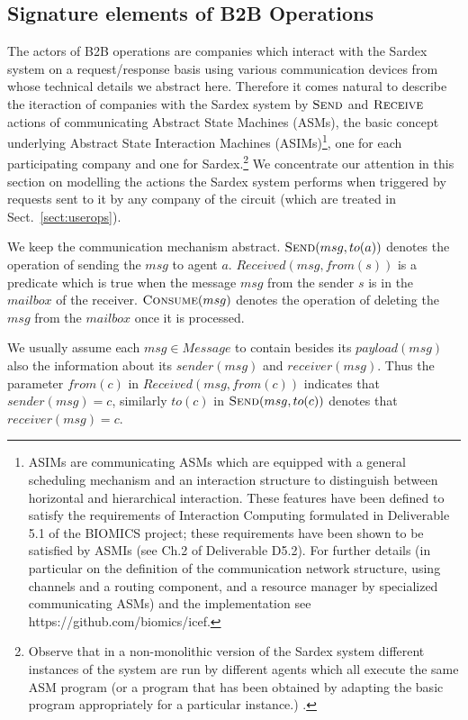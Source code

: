 \subsection{Signature elements of B2B Operations}
\label{signaturepaymtop}
The actors of B2B operations are companies which interact with the Sardex system on a request/response basis using various 
communication devices from whose technical details we abstract here. Therefore it comes natural to describe the iteraction of companies with the Sardex system by 
$\hbox{\sc Send}$ and $\hbox{\sc Receive}$ actions of communicating Abstract State Machines
(ASMs), the basic concept underlying Abstract State Interaction Machines (ASIMs)\footnote{ASIMs are communicating ASMs which are equipped with a general
scheduling mechanism and an interaction structure to distinguish
between horizontal and hierarchical interaction. These features have
been defined to satisfy the requirements of Interaction Computing
formulated in Deliverable 5.1 of the BIOMICS project; these
requirements have been shown to be satisfied by ASMIs (see Ch.2 of
Deliverable D5.2). For further details (in particular on the
definition of the communication network structure, using channels and
a routing component, and a resource manager by specialized
communicating ASMs) and the implementation see
https://github.com/biomics/icef.}, one for each participating company and one for Sardex.\footnote{Observe that 
in a non-monolithic version of the Sardex system different 	instances of the system are run by different agents which all execute the same ASM program (or a program that has been obtained by adapting the basic program appropriately for a particular instance.) .} We concentrate our attention in this section 
on modelling the actions the Sardex system performs when triggered by requests sent to it by any company of the circuit (which are treated in Sect.~\ref{sect:userops}).

We keep the communication mechanism abstract. $\hbox{\sc Send}(msg,to(a))$ denotes the operation of sending the $msg$ to agent $a$. 
$Received(msg,from(s))$ is a predicate which is true when the message $msg$ from the sender $s$ is in the $mailbox$ of the receiver. $\hbox{\sc Consume}(msg)$ denotes the operation of deleting the $msg$ from the $mailbox$ once it is processed. 

We usually assume  each $msg \in Message$ to contain besides its $payload(msg)$ also the information about its $sender(msg)$ and $receiver(msg)$. Thus the parameter $from(c)$ in $Received(msg,from(c))$ indicates that $sender(msg)=c$, similarly $to(c)$ in $\hbox{\sc Send}(msg,to(c))$ denotes that\\ $receiver(msg) = c$.

